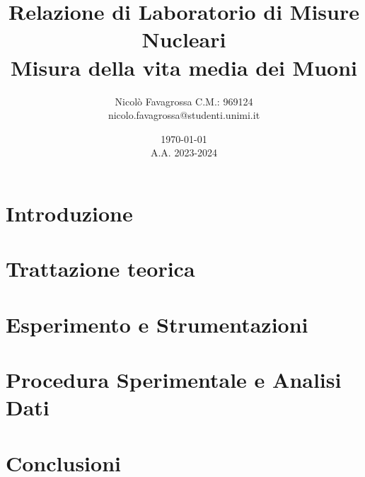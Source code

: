 \documentclass[11pt]{article}
\title{Relazione di Laboratorio di Misure Nucleari\\ Misura della vita media dei Muoni }
\author{Nicolò Favagrossa C.M.: 969124\\nicolo.favagrossa@studenti.unimi.it}
\date{\today\\A.A. 2023-2024}
\begin{document}
\maketitle
\newpage
\tableofcontents
\newpage
\section{Introduzione}

\section{Trattazione teorica}

\section{Esperimento e Strumentazioni}

\section{Procedura Sperimentale e Analisi Dati}

\section{Conclusioni}

\end{document}
